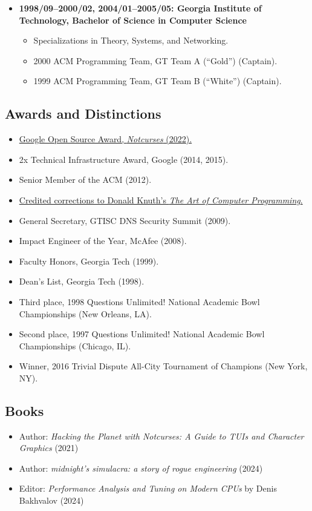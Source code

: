 \documentclass{article}
\newenvironment{tightitemize}
{\begin{itemize}
  \setlength{\itemsep}{1pt}
  \setlength{\parskip}{0pt}
  \setlength{\parsep}{0pt}}
{\end{itemize}}
\begin{document}
\begin{tightitemize}
\item \textbf{1998/09--2000/02, 2004/01--2005/05: Georgia Institute of Technology,
Bachelor of Science in Computer Science}
\begin{tightitemize}
\item Specializations in Theory, Systems, and Networking.
\item 2000 ACM Programming Team, GT Team A (``Gold'') (Captain).
\item 1999 ACM Programming Team, GT Team B (``White'') (Captain).
\end{tightitemize}
\end{tightitemize}

\vspace{2mm}
\subsection*{Awards and Distinctions}
\begin{tightitemize}
\item \href{https://opensource.googleblog.com/2022/09/announcing-the-second-group-of-open-source-peer-bonus-winners-in-2022.html}{Google Open Source Award, \textit{Notcurses} (2022).}
\item 2x Technical Infrastructure Award, Google (2014, 2015).
\item Senior Member of the ACM (2012).
\item \href{https://www-cs-faculty.stanford.edu/~knuth/boss.html}{Credited corrections to Donald Knuth's \textit{The Art of Computer Programming}.}
\item General Secretary, GTISC DNS Security Summit (2009).
\item Impact Engineer of the Year, McAfee (2008).
\item Faculty Honors, Georgia Tech (1999).
\item Dean's List, Georgia Tech (1998).
\item Third place, 1998 Questions Unlimited! National Academic Bowl Championships (New Orleans, LA).
\item Second place, 1997 Questions Unlimited! National Academic Bowl Championships (Chicago, IL).
\item Winner, 2016 Trivial Dispute All-City Tournament of Champions (New York, NY).
\end{tightitemize}

\vspace{2mm}
\subsection*{Books}
\begin{tightitemize}
\item Author: \textit{Hacking the Planet with Notcurses: A Guide to TUIs and Character Graphics} (2021)
\item Author: \textit{midnight's simulacra: a story of rogue engineering} (2024)
\item Editor: \textit{Performance Analysis and Tuning on Modern CPUs} by Denis Bakhvalov (2024)
\end{tightitemize}
\end{document}
